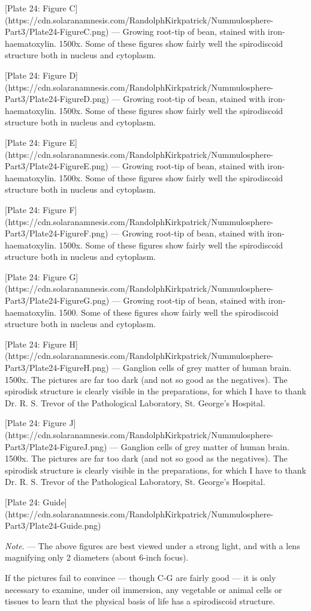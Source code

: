 \documentclass[a4paper, 12pt, oneside]{article}
\begin{document}
[Plate 24: Figure C](https://cdn.solaranamnesis.com/RandolphKirkpatrick/Nummulosphere-Part3/Plate24-FigureC.png) --- Growing root-tip of bean, stained with iron-haematoxylin. 1500x. Some of these figures show fairly well the spirodiscoid structure both in nucleus and cytoplasm.

[Plate 24: Figure D](https://cdn.solaranamnesis.com/RandolphKirkpatrick/Nummulosphere-Part3/Plate24-FigureD.png) --- Growing root-tip of bean, stained with iron-haematoxylin. 1500x. Some of these figures show fairly well the spirodiscoid structure both in nucleus and cytoplasm.

[Plate 24: Figure E](https://cdn.solaranamnesis.com/RandolphKirkpatrick/Nummulosphere-Part3/Plate24-FigureE.png) --- Growing root-tip of bean, stained with iron-haematoxylin. 1500x. Some of these figures show fairly well the spirodiscoid structure both in nucleus and cytoplasm.

[Plate 24: Figure F](https://cdn.solaranamnesis.com/RandolphKirkpatrick/Nummulosphere-Part3/Plate24-FigureF.png) --- Growing root-tip of bean, stained with iron-haematoxylin. 1500x. Some of these figures show fairly well the spirodiscoid structure both in nucleus and cytoplasm.

[Plate 24: Figure G](https://cdn.solaranamnesis.com/RandolphKirkpatrick/Nummulosphere-Part3/Plate24-FigureG.png) --- Growing root-tip of bean, stained with iron-haematoxylin. 1500. Some of these figures show fairly well the spirodiscoid structure both in nucleus and cytoplasm.

[Plate 24: Figure H](https://cdn.solaranamnesis.com/RandolphKirkpatrick/Nummulosphere-Part3/Plate24-FigureH.png) --- Ganglion cells of grey matter of human brain. 1500x. The pictures are far too dark (and not so good as the negatives). The spirodisk structure is clearly visible in the preparations, for which I have to thank Dr. R. S. Trevor of the Pathological Laboratory, St. George's Hospital.

[Plate 24: Figure J](https://cdn.solaranamnesis.com/RandolphKirkpatrick/Nummulosphere-Part3/Plate24-FigureJ.png) --- Ganglion cells of grey matter of human brain. 1500x. The pictures are far too dark (and not so good as the negatives). The spirodisk structure is clearly visible in the preparations, for which I have to thank Dr. R. S. Trevor of the Pathological Laboratory, St. George's Hospital.

[Plate 24: Guide](https://cdn.solaranamnesis.com/RandolphKirkpatrick/Nummulosphere-Part3/Plate24-Guide.png)

\emph{Note}. --- The above figures are best viewed under a strong light, and with a lens magnifying only 2 diameters (about 6-inch focus).

If the pictures fail to convince --- though C-G are fairly good --- it is only necessary to examine, under oil immersion, any vegetable or animal cells or tissues to learn that the physical basis of life has a spirodiscoid structure.
\clearpage
\end{document}
